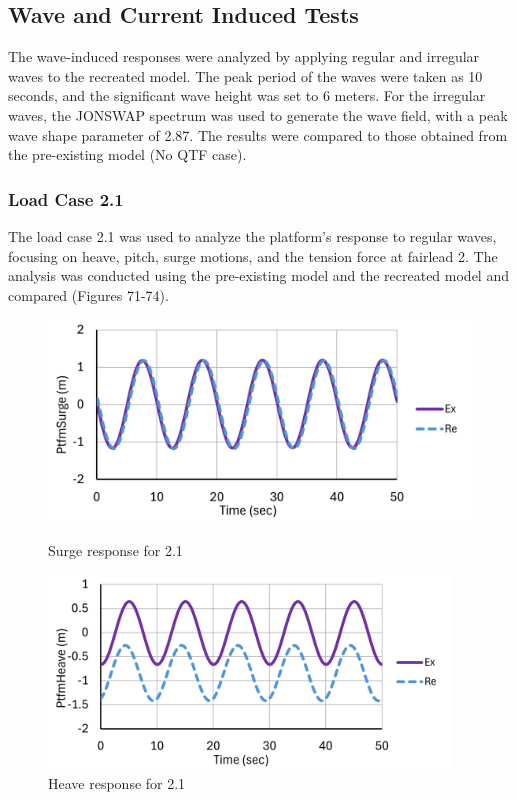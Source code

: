 \documentclass[a4paper, 11pt]{article}
\begin{document}
\subsection{Wave and Current Induced Tests}

\hspace*{0.5cm}The wave-induced responses were analyzed by applying regular and irregular waves to the recreated model. The peak period of the waves were taken as 10 seconds, and the significant wave height was set to 6 meters. For the irregular waves, the JONSWAP spectrum was used to generate the wave field, with a peak wave shape parameter of 2.87. The results were compared to those obtained from the pre-existing model (No QTF case).

\subsubsection{Load Case 2.1}
\hspace*{0.5cm}The load case 2.1 was used to analyze the platform’s response to regular waves, focusing on heave, pitch, surge motions, and the tension force at fairlead 2. The analysis was conducted using the pre-existing model and the recreated model and compared (Figures 71-74).

\begin{figure}[H]
    \begin{minipage}{0.48\textwidth}
        \centering
        \includegraphics[width=1\textwidth]{2.1_surge_mine_1.png}
        \caption{\small Surge response for 2.1}
        \label{fig:2.1_surge_mine_recreated}
    \end{minipage}
    \hfill
    \begin{minipage}{0.5\textwidth}
        \centering
        \includegraphics[width=0.95\textwidth]{2.1_heave_mine_1.png}
        \caption{\small Heave response for 2.1}
        \label{fig:2.1_heave_mine_recreated}
    \end{minipage}
\end{figure}
\end{document}
